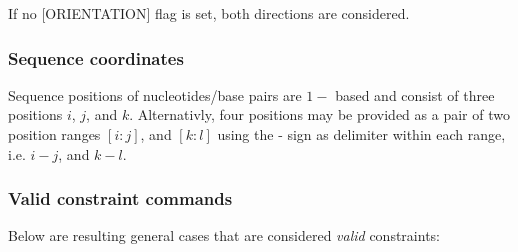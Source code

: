 If no {\ttfamily }\mbox{[}O\+R\+I\+E\+N\+T\+A\+T\+I\+ON\mbox{]} flag is set, both directions are considered.\hypertarget{file_formats_const_file_seq_coords}{}\subsubsection{Sequence coordinates}\label{file_formats_const_file_seq_coords}
Sequence positions of nucleotides/base pairs are $ 1- $ based and consist of three positions $ i $, $ j $, and $ k $. Alternativly, four positions may be provided as a pair of two position ranges $ [i:j] $, and $ [k:l] $ using the \textquotesingle{}-\/\textquotesingle{} sign as delimiter within each range, i.\+e. $ i-j $, and $ k-l $.\hypertarget{file_formats_const_file_syntax}{}\subsubsection{Valid constraint commands}\label{file_formats_const_file_syntax}
Below are resulting general cases that are considered {\itshape valid} constraints\+:


